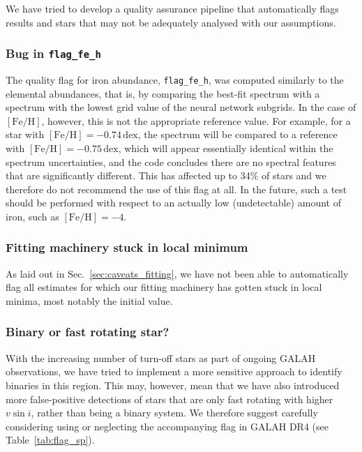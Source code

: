 \documentclass[
  journal=pasa,
  manuscript=research-paper, %
  year=2024,
  volume=37
]{cup-journal}
\newcommand{\feh}{$\mathrm{[Fe/H]}$\xspace}
\newcommand{\vsini}{$v \sin i$\xspace}
\begin{document}
We have tried to develop a quality assurance pipeline that automatically flags results and stars that may not be adequately analysed with our assumptions.

\subsubsection{Bug in \texttt{flag\_fe\_h}} \label{sec:bug_in_fe_h}

The quality flag for iron abundance, \texttt{flag\_fe\_h}, was computed similarly to the elemental abundances, that is, by comparing the best-fit spectrum with a spectrum with the lowest grid value of the neural network subgrids. In the case of \feh, however, this is not the appropriate reference value. For example, for a star with $\mathrm{[Fe/H]} = -0.74\,\mathrm{dex}$, the spectrum will be compared to a reference with $\mathrm{[Fe/H]} = -0.75\,\mathrm{dex}$, which will appear essentially identical within the spectrum uncertainties, and the code concludes there are no spectral features that are significantly different. This has affected up to 34\% of stars and we therefore do not recommend the use of this flag at all. In the future, such a test should be performed with respect to an actually low (undetectable) amount of iron, such as $\mathrm{[Fe/H]} = -4$.

\subsubsection{Fitting machinery stuck in local minimum}

As laid out in Sec.~\ref{sec:caveats_fitting}, we have not been able to automatically flag all estimates for which our fitting machinery has gotten stuck in local minima, most notably the initial value.

\subsubsection{Binary or fast rotating star?}

With the increasing number of turn-off stars as part of ongoing GALAH observations, we have tried to implement a more sensitive approach to identify binaries in this region. This may, however, mean that we have also introduced more false-positive detections of stars that are only fast rotating with higher \vsini, rather than being a binary system. We therefore suggest carefully considering using or neglecting the accompanying flag in GALAH DR4 (see Table~\ref{tab:flag_sp}).
\end{document}
